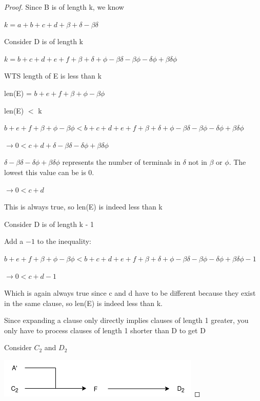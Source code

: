 \documentclass[manuscript]{acmart}
\begin{document}
\begin{proof}
        Since B is of length k, we know 

        $k = a + b + c + d + \beta + \delta - \beta \delta$

        Consider D is of length k

        $k = b + c + d + e + f + \beta + \delta + \phi - \beta \delta 
        - \beta \phi - \delta \phi + \beta \delta \phi$

        WTS length of E is less than k

        len(E) = $b + e + f + \beta + \phi - \beta \phi$

        len(E) $<$ k

        $b + e + f + \beta + \phi - \beta \phi < b + c + d + e + f + \beta + \delta + \phi - \beta \delta 
        - \beta \phi - \delta \phi + \beta \delta \phi$

        $\rightarrow 0 < c + d + \delta - \beta \delta 
        - \delta \phi + \beta \delta \phi$

        $\delta - \beta \delta - \delta \phi + \beta \delta \phi$ represents
        the number of terminals in $\delta$ not in $\beta$ or $\phi$. The lowest
        this value can be is 0.

        $\rightarrow 0 < c + d$

        This is always true, so len(E) is indeed less than k

        Consider D is of length k - 1

        Add a $-1$ to the inequality:

        $b + e + f + \beta + \phi - \beta \phi < b + c + d + e + f + \beta + \delta + \phi - \beta \delta 
        - \beta \phi - \delta \phi + \beta \delta \phi - 1$

        $\rightarrow 0 < c + d - 1$

        Which is again always true since c and d have to be different because
        they exist in the same clause, so len(E) is indeed less than k.

        Since expanding a clause only directly implies clauses of length 1 greater, 
        you only have to process clauses of length 1 shorter than D to get D

        Consider $C_2$ and $D_2$

        \includegraphics[scale=0.8]{318c.png}
        

\end{proof}
\end{document}
